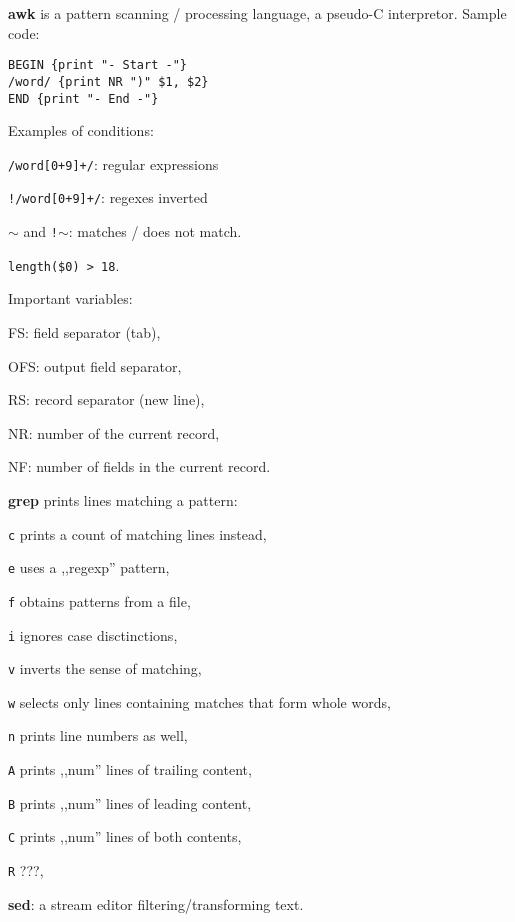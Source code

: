 \renewcommand\theFancyVerbLine{\normalsize\arabic{FancyVerbLine}}

\begin{enumx}
    \item [\cmd] \textbf{awk} is a pattern scanning / processing language,
    a pseudo-C interpretor.
    Sample code:
\begin{verbatim}
BEGIN {print "- Start -"}
/word/ {print NR ")" $1, $2}
END {print "- End -"}
\end{verbatim}

\item [] Examples of conditions:
\begin{enumx}
    \item \texttt{/word[0+9]+/}: regular expressions
    \item \texttt{!/word[0+9]+/}: regexes inverted
    \item \texttt{$\sim$} and \texttt{!$\sim$}: matches / does not match.
    \item \texttt{length(\$0) > 18}.
\end{enumx} 

\item [] Important variables:
\begin{enumx}
    \item FS: field separator (tab),
    \item OFS: output field separator,
    \item RS: record separator (new line),
    \item NR: number of the current record,
    \item NF: number of fields in the current record.
\end{enumx} 

\item [\cmd] \textbf{grep} prints lines matching a pattern:
\item [\texttt{c}] prints a count of matching lines instead,
\item [\texttt{e}] uses a ,,regexp'' pattern,
\item [\texttt{f}] obtains patterns from a file,
\item [\texttt{i}] ignores case disctinctions,
\item [\texttt{v}] inverts the sense of matching,
\item [\texttt{w}] selects only lines containing matches that form whole words,
\item [\texttt{n}] prints line numbers as well,
\item [\texttt{A}] prints ,,num'' lines of trailing content,
\item [\texttt{B}] prints ,,num'' lines of leading content,
\item [\texttt{C}] prints ,,num'' lines of both contents,
\item [\texttt{R}] ???,
\item [\cmd] \textbf{sed}: a stream editor filtering/transforming text.
\end{enumx}

